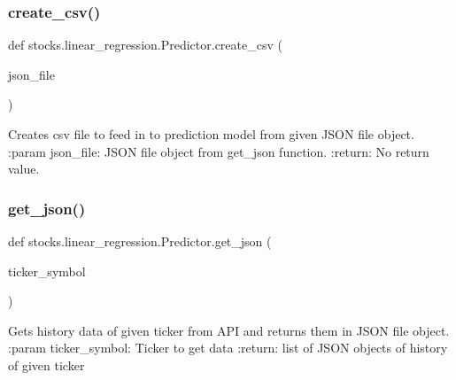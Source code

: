 \subsubsection{\texorpdfstring{create\+\_\+csv()}{create\_csv()}}
{\footnotesize\ttfamily def stocks.\+linear\+\_\+regression.\+Predictor.\+create\+\_\+csv (\begin{DoxyParamCaption}\item[{}]{json\+\_\+file }\end{DoxyParamCaption})\hspace{0.3cm}{\ttfamily [static]}}

\begin{DoxyVerb}Creates csv file to feed in to prediction model from given JSON file
object.
:param json_file: JSON file object from get_json function.
:return: No return value.
\end{DoxyVerb}
 \mbox{\label{classstocks_1_1linear__regression_1_1_predictor_a828b522dbfc376cb06d5e28a9baf3035}} 
\subsubsection{\texorpdfstring{get\+\_\+json()}{get\_json()}}
{\footnotesize\ttfamily def stocks.\+linear\+\_\+regression.\+Predictor.\+get\+\_\+json (\begin{DoxyParamCaption}\item[{}]{ticker\+\_\+symbol }\end{DoxyParamCaption})\hspace{0.3cm}{\ttfamily [static]}}

\begin{DoxyVerb}Gets history data of given ticker from API and returns them in
JSON file object.
:param ticker_symbol: Ticker to get data
:return: list of JSON objects of history of given ticker
\end{DoxyVerb}
 \mbox{\label{classstocks_1_1linear__regression_1_1_predictor_a5cd7db298bf453a953032e1458b5d17f}} 
